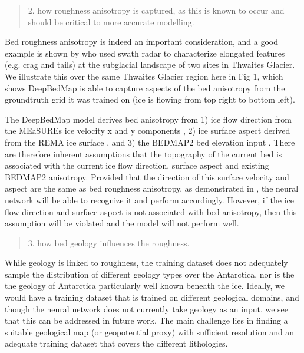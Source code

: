 \begin{quote}
\color{blue}
  2. how roughness anisotropy is captured, as this is known to occur and should be critical to more accurate modelling.
\end{quote}

Bed roughness anisotropy is indeed an important consideration, and a good example is shown by \citet{HolschuhLinkingpostglaciallandscapes2020} who used swath radar to characterize elongated features (e.g. crag and tails) at the subglacial landscape of two sites in Thwaites Glacier.
We illustrate this over the same Thwaites Glacier region here in Fig 1, which shows DeepBedMap is able to capture aspects of the bed anisotropy from the groundtruth grid it was trained on (ice is flowing from top right to bottom left).

\iffalse
\begin{figure}[htbp]
  \texttt{[image: figure-1\_thwaites\_glacier\_anisotropy.png]}
  \caption{
    Comparison of bed elevation grid products over Thwaites Glacier.
    Top - Groundtruth from gridded Operation IceBridge points.
    Middle - DeepBedMap.
    Bottom - BEDMAP2.
  }
  \label{fig:A}
\end{figure}
\fi

The DeepBedMap model derives bed anisotropy from 1) ice flow direction from the MEaSUREs ice velocity x and y components \citep{MouginotMEaSUREsPhaseMap2019}, 2) ice surface aspect derived from the REMA ice surface \citep{HowatReferenceElevationModel2019}, and 3) the BEDMAP2 bed elevation input \citep{FretwellBedmap2improvedice2013}.
There are therefore inherent assumptions that the topography of the current bed is associated with the current ice flow direction, surface aspect and existing BEDMAP2 anisotropy.
Provided that the direction of this surface velocity and aspect are the same as bed roughness anisotropy, as demonstrated in \citep{HolschuhLinkingpostglaciallandscapes2020}, the neural network will be able to recognize it and perform accordingly.
However, if the ice flow direction and surface aspect is not associated with bed anisotropy, then this assumption will be violated and the model will not perform well.

\begin{quote}
\color{blue}
  3. how bed geology influences the roughness.
\end{quote}

While geology is linked to roughness, the training dataset does not adequately sample the distribution of different geology types over the Antarctica, nor is the the geology of Antarctica particularly well known beneath the ice.
Ideally, we would have a training dataset that is trained on different geological domains, and though the neural network does not currently take geology as an input, we see that this can be addressed in future work.
The main challenge lies in finding a suitable geological map (or geopotential proxy) with sufficient resolution and an adequate training dataset that covers the different lithologies.

